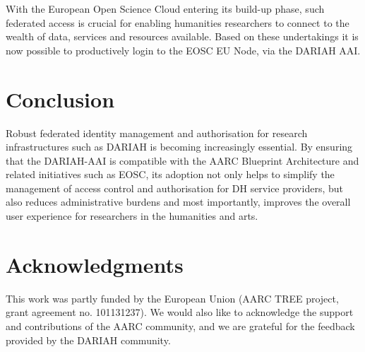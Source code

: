\documentclass[final]{anthology-ch} %
\begin{document}
With the European Open Science Cloud entering its build-up phase, 
such federated access is crucial for enabling humanities researchers to connect to the wealth of data, services and resources available.
Based on these undertakings it is now possible to productively login to the EOSC EU Node, via the DARIAH AAI.

\section{Conclusion}

Robust federated identity management and authorisation for research infrastructures such as DARIAH is becoming increasingly essential. By ensuring that the DARIAH-AAI is compatible with the AARC Blueprint Architecture and related initiatives such as EOSC, its adoption not only helps to simplify the management of access control and authorisation for DH service providers, but also reduces administrative burdens and most importantly, improves the overall user experience for researchers in the humanities and arts. 


\section*{Acknowledgments}

This work was partly funded by the European Union (AARC TREE project, grant agreement no. 101131237).
We would also like to acknowledge the support and contributions of the AARC community, and we are grateful for the feedback provided by the DARIAH community.



\printbibliography










 
\end{document}
